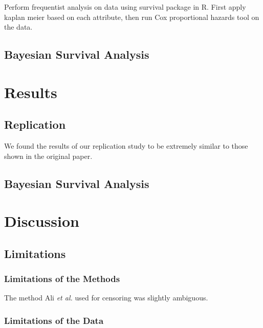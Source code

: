 \documentclass[acmconf]{acmart}
\begin{document}
Perform frequentist analysis on data using survival package in R. First apply kaplan meier based on each attribute, then run Cox proportional hazards tool on the data.

\subsection{Bayesian Survival Analysis}



\section{Results}

\subsection{Replication}

We found the results of our replication study to be extremely similar to those shown in the original paper.



\subsection{Bayesian Survival Analysis}


\section{Discussion}

\subsection{Limitations}

\subsubsection{Limitations of the Methods}

The method Ali \emph{et al.} used for censoring was slightly ambiguous.

\subsubsection{Limitations of the Data}
\end{document}
